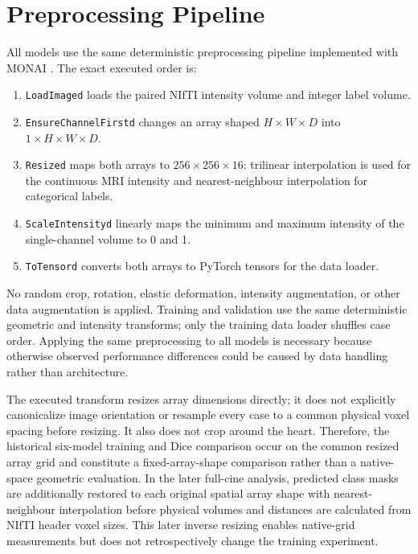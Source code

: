 \section{Preprocessing Pipeline}
All models use the same deterministic preprocessing pipeline implemented with MONAI \citep{cardoso2022monai}. The exact executed order is:
\begin{enumerate}
    \item \texttt{LoadImaged} loads the paired NIfTI intensity volume and integer label volume.
    \item \texttt{EnsureChannelFirstd} changes an array shaped $H\times W\times D$ into $1\times H\times W\times D$.
    \item \texttt{Resized} maps both arrays to $256\times256\times16$: trilinear interpolation is used for the continuous MRI intensity and nearest-neighbour interpolation for categorical labels.
    \item \texttt{ScaleIntensityd} linearly maps the minimum and maximum intensity of the single-channel volume to 0 and 1.
    \item \texttt{ToTensord} converts both arrays to PyTorch tensors for the data loader.
\end{enumerate}
No random crop, rotation, elastic deformation, intensity augmentation, or other data augmentation is applied. Training and validation use the same deterministic geometric and intensity transforms; only the training data loader shuffles case order. Applying the same preprocessing to all models is necessary because otherwise observed performance differences could be caused by data handling rather than architecture.

The executed transform resizes array dimensions directly; it does not explicitly canonicalize image orientation or resample every case to a common physical voxel spacing before resizing. It also does not crop around the heart. Therefore, the historical six-model training and Dice comparison occur on the common resized array grid and constitute a fixed-array-shape comparison rather than a native-space geometric evaluation. In the later full-cine analysis, predicted class masks are additionally restored to each original spatial array shape with nearest-neighbour interpolation before physical volumes and distances are calculated from NIfTI header voxel sizes. This later inverse resizing enables native-grid measurements but does not retrospectively change the training experiment.

